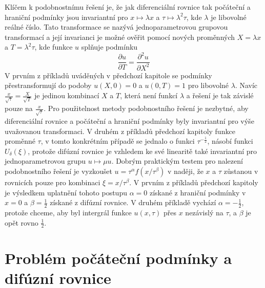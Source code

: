 \documentclass[a4paper]{book}
\begin{document}
Klíčem k podobnostnímu řešení je, že jak diferenciální rovnice tak počáteční a hraniční podmínky jsou invariantní pro $x \mapsto \lambda x$ a $\tau \mapsto \lambda^2 \tau$, kde $\lambda$ je libovolné reálné číslo. Tato transformace se nazývá jednoparametrovou grupovou transformací a její invarianci je možné ověřit pomocí nových proměnných $X = \lambda x$ a $T = \lambda^2 \tau$, kde funkce $u$ splňuje podmínku
\begin{equation*}
\frac{\partial u}{\partial T} = \frac{\partial^2 u}{\partial X^2}
\end{equation*}
V prvním z příkladů uváděných v předchozí kapitole se podmínky přestransformují do podoby $u(X,0)=0$ a $u(0,T)=1$ pro libovolné $\lambda$. Navíc $\frac{x}{\sqrt{\tau}} = \frac{X}{\sqrt{T}}$ je jedinou kombinací $X$ a $T$, která není funkcí $\lambda$ a řešení je tak závislé pouze na $\frac{x}{\sqrt{\tau}}$. Pro použitelnost metody podobnostního řešení je nezbytné, aby diferenciální rovnice a počáteční a hraniční podmínky byly invariantní pro výše uvažovanou transformaci. V druhém z příkladů předchozí kapitoly funkce proměnné $\tau$, v tomto konkrétním případě se jednalo o funkci $\tau^{-\frac{1}{2}}$, násobí funkci $U_{\delta}(\xi)$, protože difúzní rovnice je vzhledem ke své linearitě také invariantní pro jednoparametrovou grupu $u \mapsto \mu u$. Dobrým praktickým testem pro nalezení podobnostního řešení je vyzkoušet $u = \tau^{\alpha} f(x/ \tau^{\beta})$ v naději, že $x$ a $\tau$ zůstanou v rovnicích pouze pro kombinaci $\xi = x/ \tau^{\beta}$. V prvním z příkladů předchozí kapitoly je výsledkem uplatnění tohoto postupu $\alpha = 0$ získané z hraniční podmínky v $x = 0$ a $\beta = \frac{1}{2}$ získané z difúzní rovnice. V druhém příkladě vychází $\alpha = -\frac{1}{2}$, protože chceme, aby byl intergrál funkce $u(x, \tau)$ přes $x$ nezávislý na $\tau$, a $\beta$ je opět rovno $\frac{1}{2}$.

\section{Problém počáteční podmínky a difúzní rovnice}
\end{document}
